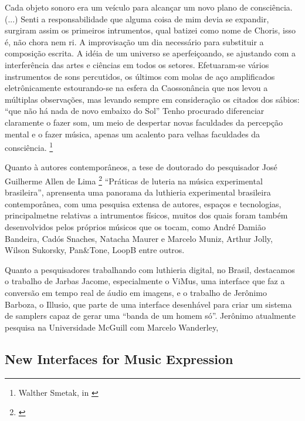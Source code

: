 \begin{citacao}
Cada objeto sonoro era um veículo para alcançar um novo plano de consciência. (...) Senti a responsabilidade que alguma coisa de mim devia se expandir, surgiram assim os primeiros intrumentos, qual batizei como nome de Choris, isso é, não chora nem ri. A improvisação um dia necessário para substituir a composição escrita. A idéia de um universo se aperfeiçoando, se ajustando com a interferência das artes e ciências em todos os setores. Efetuaram-se vários instrumentos de sons percutidos, os últimos com molas de aço amplificados eletrônicamente estourando-se na esfera da Caossonância que nos levou a múltiplas observações, mas levando sempre em consideração os citados dos sábios: ``que não há nada de novo embaixo do Sol''
Tenho procurado diferenciar claramente o fazer som, um meio de despertar novas faculdades da percepção mental e o fazer música, apenas um acalento para velhas faculdades da consciência. \footnote{Walther Smetak, in \cite{JessicaSmetakPaoli2010}}
\end{citacao}

Quanto à autores contemporâneos, a tese de doutorado do pesquisador José Guilherme Allen de Lima \footnote{\cite{Lima2018}} ``Práticas de luteria na música experimental brasileira'', aprensenta uma panorama da luthieria experimental brasileira contemporânea, com uma pesquisa extensa de autores, espaços e tecnologias, principalmetne relativas a intrumentos físicos, muitos dos quais foram também desenvolvidos pelos próprios músicos que os tocam, como André Damião Bandeira, Cadós Snaches, Natacha Maurer e Marcelo Muniz, Arthur Jolly, Wilson Sukorsky, Pan\&Tone, LoopB entre outros.

Quanto a pesquisadores trabalhando com luthieria digital, no Brasil, destacamos o trabalho de Jarbas Jacome, especialmente o ViMus, uma interface que faz a conversão em tempo real de áudio em imagens, e o trabalho de Jerônimo Barboza, o Illusio, que parte de uma interface desenhável para criar um sistema de samplers capaz de gerar uma ``banda de um homem só''. Jerônimo atualmente pesquisa na Universidade McGuill com Marcelo Wanderley, 


\subsection{New Interfaces for Music Expression}





